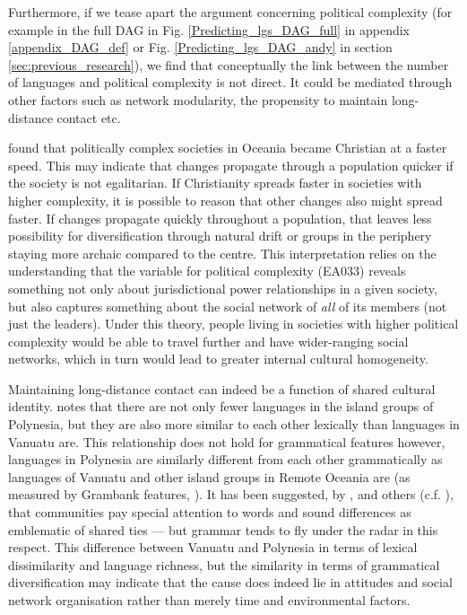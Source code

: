 \documentclass[12pt,letterpaper]{article}
\begin{document}
Furthermore, if we tease apart the argument concerning political complexity (for example in the full DAG in Fig. \ref{Predicting_lgs_DAG_full} in appendix \ref{appendix_DAG_def} or Fig. \ref{Predicting_lgs_DAG_andy} in section \ref{sec:previous_research}), we find that conceptually the link between the number of languages and political complexity is not direct. It could be mediated through other factors such as network modularity, the propensity to maintain long-distance contact etc. 

\citet{watts_2018} found that politically complex societies in Oceania became Christian at a faster speed. This may indicate that changes propagate through a population quicker if the society is not egalitarian. If Christianity spreads faster in societies with higher complexity, it is possible to reason that other changes also might spread faster. If changes propagate quickly throughout a population, that leaves less possibility for diversification through natural drift or groups in the periphery staying more archaic compared to the centre. This interpretation relies on the understanding that the variable for political complexity (EA033) reveals something not only about jurisdictional power relationships in a given society, but also captures something about the social network of \emph{all} of its members (not just the leaders). Under this theory, people living in societies with higher political complexity would be able to travel further and have wider-ranging social networks, which in turn would lead to greater internal cultural homogeneity.

Maintaining long-distance contact can indeed be a function of shared cultural identity. \citet[218-291]{skirgaard2020multilevel} notes that there are not only fewer languages in the island groups of Polynesia, but they are also more similar to each other lexically than languages in Vanuatu are. This relationship does not hold for grammatical features however, languages in Polynesia are similarly different from each other grammatically as languages of Vanuatu and other island groups in Remote Oceania are (as measured by Grambank features, \citep{grambank_release}). It has been suggested, by \citet{silverstein1981limits}, \citet{francois2011} and others (c.f. \citet{mansfield2023dialect}), that communities pay special attention to words and sound differences as emblematic of shared ties --- but grammar tends to fly under the radar in this respect. This difference between Vanuatu and Polynesia in terms of lexical dissimilarity and language richness, but the similarity in terms of grammatical diversification may indicate that the cause does indeed lie in attitudes and social network organisation rather than merely time and environmental factors.
\end{document}
